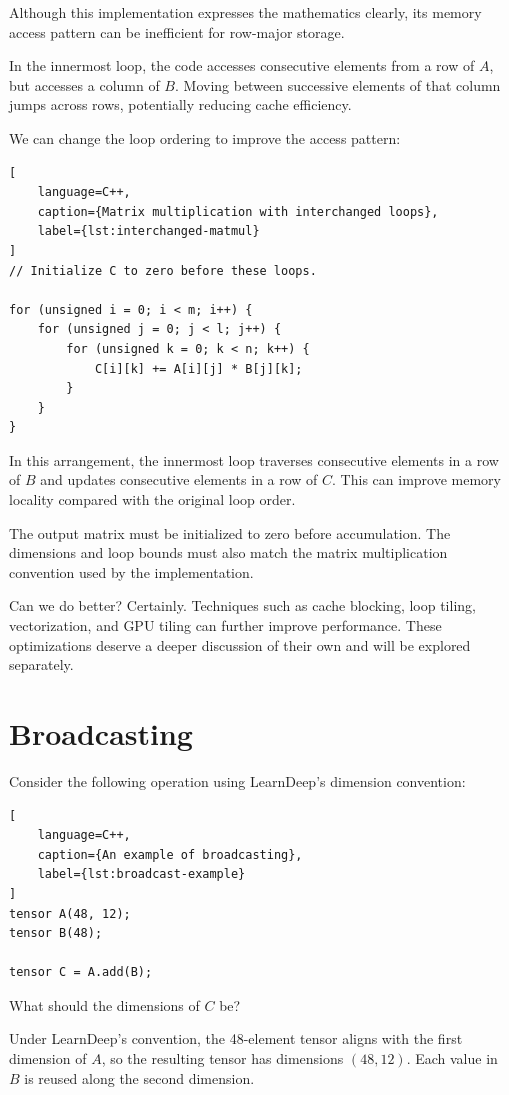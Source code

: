 Although this implementation expresses the mathematics clearly, its memory access pattern can be inefficient for row-major storage.

In the innermost loop, the code accesses consecutive elements from a row of \(A\), but accesses a column of \(B\). Moving between successive elements of that column jumps across rows, potentially reducing cache efficiency.

We can change the loop ordering to improve the access pattern:

\begin{lstlisting}[
    language=C++,
    caption={Matrix multiplication with interchanged loops},
    label={lst:interchanged-matmul}
]
// Initialize C to zero before these loops.

for (unsigned i = 0; i < m; i++) {
    for (unsigned j = 0; j < l; j++) {
        for (unsigned k = 0; k < n; k++) {
            C[i][k] += A[i][j] * B[j][k];
        }
    }
}
\end{lstlisting}

In this arrangement, the innermost loop traverses consecutive elements in a row of \(B\) and updates consecutive elements in a row of \(C\). This can improve memory locality compared with the original loop order.

The output matrix must be initialized to zero before accumulation. The dimensions and loop bounds must also match the matrix multiplication convention used by the implementation.

Can we do better? Certainly. Techniques such as cache blocking, loop tiling, vectorization, and GPU tiling can further improve performance. These optimizations deserve a deeper discussion of their own and will be explored separately.

\section{Broadcasting}

Consider the following operation using LearnDeep's dimension convention:

\begin{lstlisting}[
    language=C++,
    caption={An example of broadcasting},
    label={lst:broadcast-example}
]
tensor A(48, 12);
tensor B(48);

tensor C = A.add(B);
\end{lstlisting}

What should the dimensions of \(C\) be?

Under LearnDeep's convention, the 48-element tensor aligns with the first dimension of \(A\), so the resulting tensor has dimensions \((48,12)\). Each value in \(B\) is reused along the second dimension.


